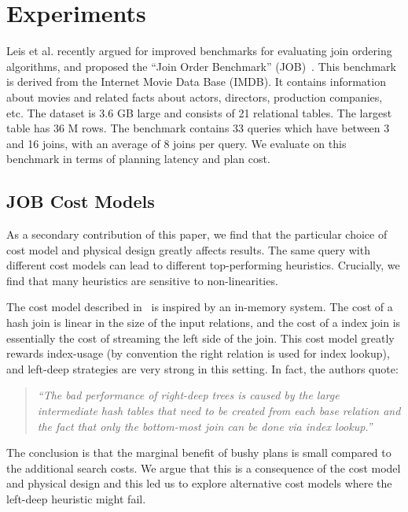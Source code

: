 \section{Experiments}
Leis et al. recently argued for improved benchmarks for evaluating join ordering algorithms, and proposed the ``Join Order Benchmark'' (JOB)~\cite{leis2015good}.
This benchmark is derived from the Internet Movie Data Base
(IMDB). It contains information
about movies and related facts about actors, directors,
production companies, etc. 
The dataset is 3.6 GB large and consists of 21 relational tables.
The largest table has
36 M rows.
The benchmark contains 33 queries which have between 3 and 16 joins, with an average of 8 joins per query. 
We evaluate \sys on this benchmark in terms of planning latency and plan cost.


\subsection{JOB Cost Models}
As a secondary contribution of this paper, we find that the particular choice of cost model and physical design greatly affects results.
The same query with different cost models can lead to different top-performing heuristics.
Crucially, we find that many heuristics are sensitive to non-linearities.

The cost model described in~\cite{leis2015good} is inspired by an in-memory system. The cost of a hash join is linear in the size of the input relations, and the cost of a index join is essentially the cost of streaming the left side of the join.
This cost model greatly rewards index-usage (by convention the right relation is used for index lookup), and left-deep strategies are very strong in this setting. In fact, the authors quote: 
\begin{quote}
\emph{``The bad performance of right-deep trees is caused by the large intermediate hash tables that need to be created from each base relation and the fact that only the bottom-most join can
be done via index lookup.''}~\cite{leis2015good} 
\end{quote}
The conclusion is that the marginal benefit of bushy plans is small compared to the additional search costs.
We argue that this is a consequence of the cost model and physical design and this led us to explore alternative cost models where the left-deep heuristic might fail.

